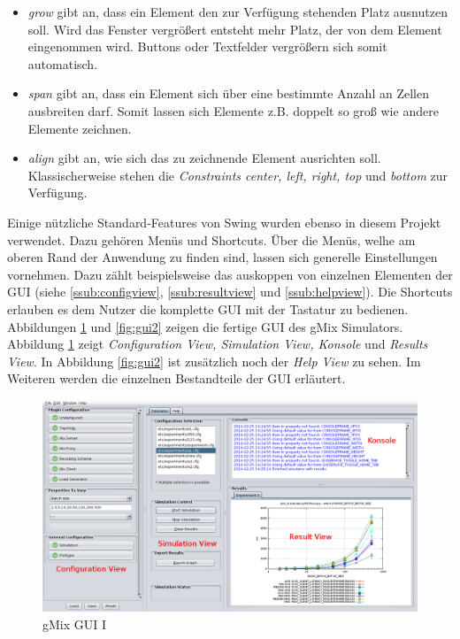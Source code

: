 \documentclass[a4paper, 11pt]{article} %
\begin{document}
\begin{itemize}
\item \emph{grow} gibt an, dass ein Element den zur Verfügung stehenden Platz ausnutzen soll. Wird das Fenster vergrößert entsteht mehr Platz, der von dem Element eingenommen wird. Buttons oder Textfelder vergrößern sich somit automatisch.
\item \emph{span} gibt an, dass ein Element sich über eine bestimmte Anzahl an Zellen ausbreiten darf. Somit lassen sich Elemente z.B. doppelt so groß wie andere Elemente zeichnen.
\item \emph{align} gibt an, wie sich das zu zeichnende Element ausrichten soll. Klassischerweise stehen die \emph{Constraints center, left, right, top} und \emph{bottom} zur Verfügung. 
\end{itemize}

Einige nützliche Standard-Features von Swing wurden ebenso in diesem Projekt verwendet. Dazu gehören Menüs und Shortcuts. Über die Menüs, welhe am oberen Rand der Anwendung zu finden sind, lassen sich generelle Einstellungen vornehmen. Dazu zählt beispielsweise das auskoppen von einzelnen Elementen der GUI (siehe \ref{ssub:configview}, \ref{ssub:resultview} und \ref{ssub:helpview}). Die Shortcuts erlauben es dem Nutzer die komplette GUI mit der Tastatur zu bedienen. \\
Abbildungen \ref{fig:gui1} und \ref{fig:gui2} zeigen die fertige GUI des gMix Simulators. Abbildung \ref{fig:gui1} zeigt \emph{Configuration View, Simulation View, Konsole} und \emph{Results View}. In Abbildung \ref{fig:gui2} ist zusätzlich noch der \emph{Help View} zu sehen. Im Weiteren werden die einzelnen Bestandteile der GUI erläutert.

\begin{figure}[!htp]
\includegraphics[width=\textwidth]{img/gmixGuiSimulator}
\caption{gMix GUI I}
\label{fig:gui1}
\end{figure}
\end{document}
